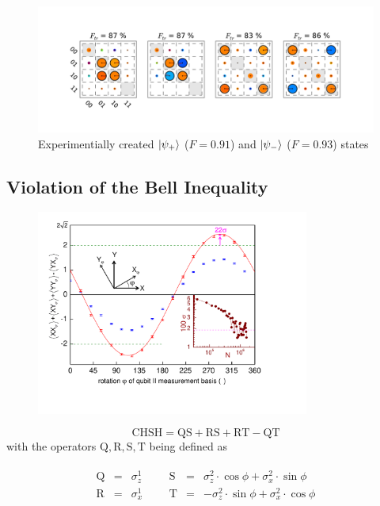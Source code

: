 \begin{figure}
  \flushright
	\includegraphics[width=1\textwidth]{"./data/ct5/2011_02_09 preparation of bell states/bell matrices"}
	\caption{Experimentially created $\left| \psi_+ \right>$ ($F = 0.91$) and $\left| \psi_- \right>$ ($F=0.93$) states}
	\label{fig:BellStates}
\end{figure}

\subsection{Violation of the Bell Inequality}

\begin{figure}
	\centering
		\includegraphics[width=0.8\textwidth]{./material/papers/iswap/figures/chsh}
	\label{fig:CHSH}
	\caption{}
\end{figure}

\begin{equation}
\mathrm{CHSH} = \mathrm{QS}+\mathrm{RS}+\mathrm{RT}-\mathrm{QT}
\end{equation}
with the operators $\mathrm{Q,R,S,T}$ being defined as

\begin{eqnarray}
	\begin{array}{cccccccc}
		\mathrm{Q} & = & \sigma_z^1 &&& \mathrm{S} & = & \sigma_z^2\cdot \cos{\phi}+\sigma_x^2 \cdot \sin{\phi} \\
		\mathrm{R} & = & \sigma_x^1 &&& \mathrm{T} & = & -\sigma_z^2\cdot \sin{\phi}+\sigma_x^2 \cdot \cos{\phi}
	\end{array}
\end{eqnarray} 

